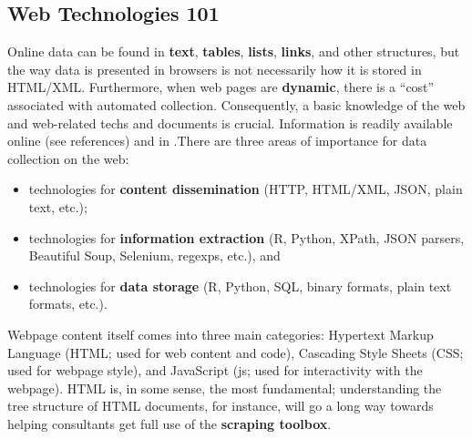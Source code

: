 \subsection{Web Technologies 101}
Online data can be found in \textbf{text}, \textbf{tables}, \textbf{lists}, \textbf{links}, and other structures, but the way data is presented in browsers is not necessarily how it is stored in HTML/XML. Furthermore, when web pages are \textbf{dynamic}, there is a ``cost'' associated with automated collection. Consequently, a basic knowledge of the web and web-related techs and documents is crucial. Information is readily available online (see references) and in  \cite{DC_M,DC_MRMN}.\newpage\noindent There are three areas of importance for data collection on the web:
\begin{itemize}[noitemsep]
\item technologies for \textbf{content dissemination} (HTTP, HTML/XML, JSON, plain text, etc.);
\item technologies for \textbf{information extraction} (R, Python, XPath, JSON parsers, Beautiful Soup, Selenium, regexps, etc.), and 
\item technologies for \textbf{data storage} (R, Python, SQL, binary formats, plain text formats, etc.).
\end{itemize}
Webpage content itself comes into three main categories: Hypertext Markup Language (HTML; used for web content and code), Cascading Style Sheets (CSS; used for webpage style), and 
JavaScript (js; used for interactivity with the webpage). HTML is, in some sense, the most fundamental; understanding the tree structure of HTML documents, for instance, will go a long way towards helping consultants get full use of the \textbf{scraping toolbox}. 
